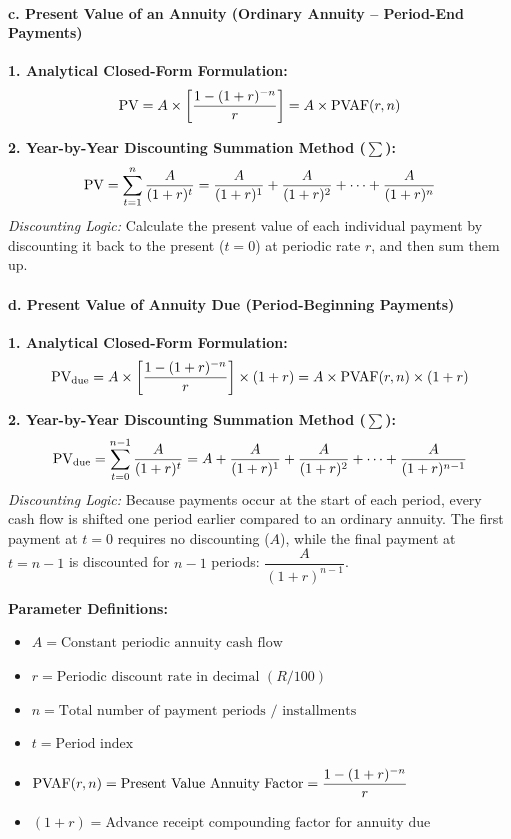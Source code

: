 \begin{formulabox}
\paragraph{c. Present Value of an Annuity (Ordinary Annuity -- Period-End Payments)}
\textbf{1. Analytical Closed-Form Formulation:}
\begin{equation}
    \operatorname{PV} = A \times \left[ \frac{1 - (1 + r)^{-n}}{r} \right] = A \times \operatorname{PVAF}(r, n)
\end{equation}

\textbf{2. Year-by-Year Discounting Summation Method ($\sum$):}
\begin{equation}
    \operatorname{PV} = \sum_{t=1}^{n} \frac{A}{(1 + r)^t} = \frac{A}{(1 + r)^1} + \frac{A}{(1 + r)^2} + \dots + \frac{A}{(1 + r)^n}
\end{equation}
\textit{Discounting Logic:} Calculate the present value of each individual payment by discounting it back to the present ($t=0$) at periodic rate $r$, and then sum them up.

\vspace{0.4em}
\paragraph{d. Present Value of Annuity Due (Period-Beginning Payments)}
\textbf{1. Analytical Closed-Form Formulation:}
\begin{equation}
    \operatorname{PV}_{\text{due}} = A \times \left[ \frac{1 - (1 + r)^{-n}}{r} \right] \times (1 + r) = A \times \operatorname{PVAF}(r, n) \times (1 + r)
\end{equation}

\textbf{2. Year-by-Year Discounting Summation Method ($\sum$):}
\begin{equation}
    \operatorname{PV}_{\text{due}} = \sum_{t=0}^{n-1} \frac{A}{(1 + r)^t} = A + \frac{A}{(1 + r)^1} + \frac{A}{(1 + r)^2} + \dots + \frac{A}{(1 + r)^{n-1}}
\end{equation}
\textit{Discounting Logic:} Because payments occur at the start of each period, every cash flow is shifted one period earlier compared to an ordinary annuity. The first payment at $t=0$ requires no discounting ($A$), while the final payment at $t=n-1$ is discounted for $n-1$ periods: $\dfrac{A}{(1+r)^{n-1}}$.

\vspace{0.3em}
\textbf{Parameter Definitions:}
\begin{itemize}[noitemsep]
    \item $A = \text{Constant periodic annuity cash flow}$
    \item $r = \text{Periodic discount rate in decimal } (R/100)$
    \item $n = \text{Total number of payment periods / installments}$
    \item $t = \text{Period index}$
    \item $\operatorname{PVAF}(r, n) = \text{Present Value Annuity Factor} = \dfrac{1 - (1+r)^{-n}}{r}$
    \item $(1 + r) = \text{Advance receipt compounding factor for annuity due}$
\end{itemize}
\end{formulabox}

